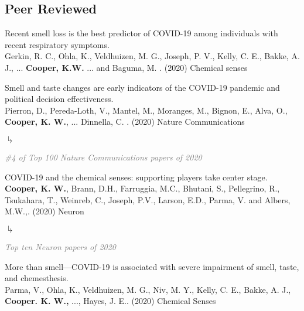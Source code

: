 \documentclass[10pt]{cooperCV2}
\begin{document}
\subsection{Peer Reviewed} 
\begin{etaremune}[resume,itemindent=-1.5\bibhang, topsep=0pt,
				   itemsep=\bibsep,partopsep=0pt,parsep=0pt,leftmargin={\bibhang+\widthof{[999]}}] 
    
    \item Recent smell loss is the best predictor of COVID-19 among individuals with recent respiratory symptoms. \\
     Gerkin, R. C., Ohla, K., Veldhuizen, M. G., Joseph, P. V., Kelly, C. E., Bakke, A. J., ... \textbf{Cooper, K.W.} ... and Baguma, M. . (2020) Chemical senses 
     
	
    \item Smell and taste changes are early indicators of the COVID-19 pandemic and political decision effectiveness. \\
     Pierron, D., Pereda-Loth, V., Mantel, M., Moranges, M., Bignon, E., Alva, O.,  \textbf{Cooper, K. W.}, ... Dinnella, C. . (2020) Nature Communications 
     
     	\begin{list}{$\drsh$}{}
     	
	      \item \textcolor{grey}{\textit{\#4 of Top 100 Nature Communications papers of 2020} }
     	
     	\end{list} 
     
	
    \item COVID-19 and the chemical senses: supporting players take center stage. \\
     \textbf{Cooper, K. W.}, Brann, D.H., Farruggia, M.C., Bhutani, S., Pellegrino, R., Tsukahara, T., Weinreb, C., Joseph, P.V., Larson, E.D., Parma, V. and Albers, M.W.,. (2020) Neuron 
     
     	\begin{list}{$\drsh$}{}
     	
	      \item \textcolor{grey}{\textit{Top ten Neuron papers of 2020} }
     	
     	\end{list} 
     
	
    \item More than smell—COVID-19 is associated with severe impairment of smell, taste, and chemesthesis. \\
     Parma, V., Ohla, K., Veldhuizen, M. G., Niv, M. Y., Kelly, C. E., Bakke, A. J., \textbf{Cooper. K. W.,} ..., Hayes, J. E.. (2020) Chemical Senses 
     

\end{etaremune}
\end{document}
